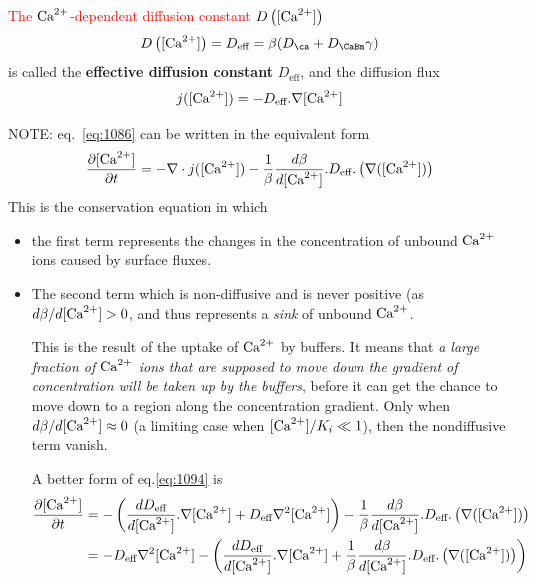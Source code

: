 \textcolor{red}{The ${\text{Ca}^{2+}}$-dependent diffusion constant} $D\left([{\text{Ca}^{2+}}] \right)$  
\begin{equation}
  \label{eq:1092}
  D\left([\Ca] \right) = 
  D_\text{eff} = \beta(D_\ca+D_\CaBm\gamma)
\end{equation}
is called the {\bf effective diffusion constant} $D_\text{eff}$,
and the diffusion flux
\begin{equation}
  \label{eq:1093}
  j([{\text{Ca}^{2+}}]) = -D_\text{eff}.\nabla[{\text{Ca}^{2+}}]
\end{equation}


NOTE: eq.~\eqref{eq:1086} can be written in the equivalent form
\begin{equation}
  \label{eq:1094}
  \frac{\partial [{\text{Ca}^{2+}}]}{\partial t} = -\nabla\cdot j([{\text{Ca}^{2+}}])
-
\frac{1}{\beta}\frac{d\beta}{d[{\text{Ca}^{2+}}]}.D_\text{eff}.\left(\nabla([{\text{Ca}^{2+}}])\right)
\end{equation}
This is the conservation equation in which 
\begin{itemize}
  \item  the first term represents the changes in the concentration of unbound
  ${\text{Ca}^{2+}}$ ions caused by surface fluxes. 
  
  
  \item The second term which is non-diffusive and is never positive (as
$d\beta/d[{\text{Ca}^{2+}}]>0$, and thus represents a {\it sink} of unbound
${\text{Ca}^{2+}}$. 

This is the result of the uptake of ${\text{Ca}^{2+}}$ by buffers. It means that {\it a large
fraction of ${\text{Ca}^{2+}}$ ions that are supposed to move down the
  gradient of concentration will be taken up by the buffers}, before it can get
  the chance to move down to a region along the concentration gradient.
Only when $d\beta/d[{\text{Ca}^{2+}}]\approx 0$ (a limiting case when $[{\text{Ca}^{2+}}]/K_i\ll 1$), then
the nondiffusive term vanish.

A better form of eq.\ref{eq:1094} is
\begin{equation}
\begin{split}
  \frac{\partial [{\text{Ca}^{2+}}]}{\partial t} &= -
  \left(\frac{dD_\text{eff}}{d[{\text{Ca}^{2+}}]}.\nabla[{\text{Ca}^{2+}}] 
  + D_\text{eff} \nabla^2[{\text{Ca}^{2+}}] \right)
-
\frac{1}{\beta}\frac{d\beta}{d[{\text{Ca}^{2+}}]}.D_\text{eff}.\left(\nabla([{\text{Ca}^{2+}}])\right) \\
&= -D_\text{eff} \nabla^2[{\text{Ca}^{2+}}]  -
  \left( 
\frac{dD_\text{eff}}{d[{\text{Ca}^{2+}}]}.\nabla[{\text{Ca}^{2+}}] +
\frac{1}{\beta}\frac{d\beta}{d[{\text{Ca}^{2+}}]}.D_\text{eff}.\left(\nabla([{\text{Ca}^{2+}}])\right)
  \right)
\end{split}
\end{equation}
\end{itemize}


